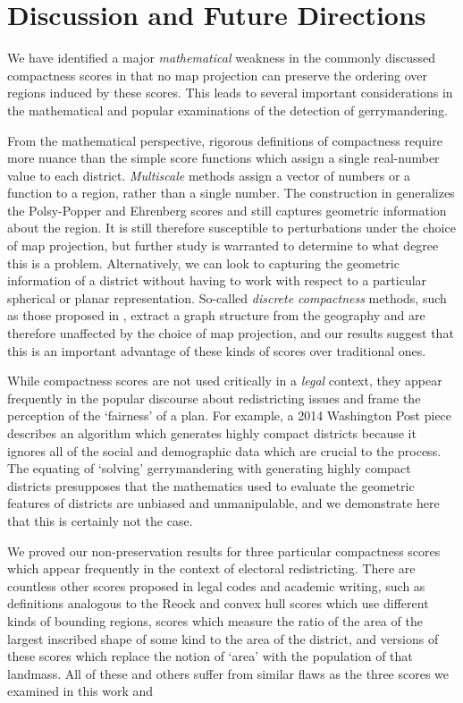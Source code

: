 \section{Discussion and Future Directions}



We have identified a major \textit{mathematical} weakness in the commonly discussed compactness scores in that no map projection can preserve the ordering over regions induced by these scores.  This leads to several important considerations in the mathematical and popular examinations of the detection of gerrymandering.

From the mathematical perspective, rigorous definitions of compactness require more nuance than the simple score functions which assign a single real-number value to each district.  \textit{Multiscale} methods assign a vector of numbers or a function to a region, rather than a single number.  The construction in \cite{deford2018tv} generalizes the Polsy-Popper and Ehrenberg scores and still captures geometric information about the region. It is still therefore susceptible to perturbations under the choice of map projection, but further study is warranted to determine to what degree this is a problem.
Alternatively, we can look to capturing the geometric information of a district without having to work with respect to a particular spherical or planar representation.  So-called \textit{discrete compactness} methods, such as those proposed in \cite{duchin2018discrete}, extract a graph structure from the geography and are therefore unaffected by the choice of map projection, and our results suggest that this is an important advantage of these kinds of scores over traditional ones.


While compactness scores are not used critically in a \textit{legal} context, they appear frequently in the popular discourse about redistricting issues and frame the perception of the `fairness' of a plan.  For example, a 2014 Washington Post piece  \cite{ingraham2014solve} describes an algorithm which generates highly compact districts because it ignores all of the social and demographic data which are crucial to the process.  The equating of `solving' gerrymandering with generating highly compact districts presupposes that the mathematics used to evaluate the geometric features of districts are unbiased and unmanipulable, and we demonstrate here that this is certainly not the case.

We proved our non-preservation results for three particular compactness scores which appear frequently in the context of electoral redistricting.  There are countless other scores proposed in legal codes and academic writing, such as definitions analogous to the Reock and convex hull scores which use different kinds of bounding regions, scores which measure the ratio of the area of the largest inscribed shape of some kind to the area of the district, and versions of these scores which replace the notion of `area' with the population of that landmass.  All of these and others suffer from similar flaws as the three scores we examined in this work and 


